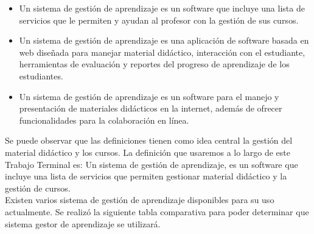     \begin{itemize}
        \item Un sistema de gestión de aprendizaje es un software que incluye  una lista de servicios que le permiten y ayudan al profesor con la gestión de sus cursos. \cite{LMS_1}
        \item  Un sistema de gestión de aprendizaje es una aplicación de software basada en web diseñada para manejar material didáctico, interacción con el estudiante, herramientas de evaluación y reportes del progreso de aprendizaje de los estudiantes. \cite{LMS_2}
        \item  Un sistema de gestión de aprendizaje es un software para el manejo y presentación de materiales didácticos en la internet, además de ofrecer funcionalidades para la colaboración en línea. \cite{LMS_3}
    \end{itemize}

    \noindent Se puede observar que las definiciones tienen como idea central la gestión del material didáctico y los cursos. La definición que usaremos a lo largo de este Trabajo Terminal es: Un sistema de gestión de aprendizaje, es un software que incluye una lista de servicios que permiten gestionar material didáctico y la gestión de cursos.\\
    


    \noindent Existen varios sistema de gestión de aprendizaje disponibles para su uso actualmente. Se realizó la siguiente tabla comparativa para poder determinar que sistema gestor de aprendizaje se utilizará.
    
